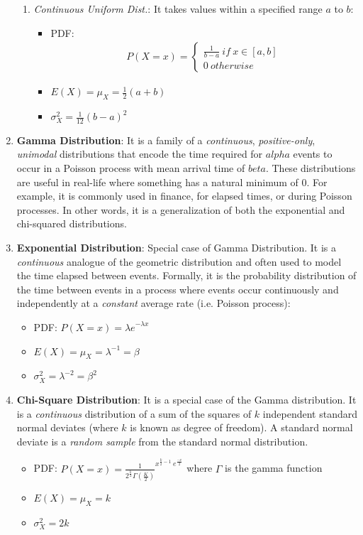 \documentclass[11pt, twocolumn]{article}
\begin{document}
\begin{enumerate}
\begin{enumerate}
	\item \textit{Continuous Uniform Dist.}: It takes values within a specified range $a$ to $b$:
		\begin{itemize}
		\item PDF:
		\begin{align*}
			P(X = x) = \begin{cases}  \frac{1}{b-a}~ if ~ x \in [a , b]\\ 0 ~ otherwise \end{cases}
		\end{align*}
		\item $E(X) = \mu_X = \frac{1}{2} (a+b)$
		\item $\sigma_X^2 =\frac{1}{12} (b - a)^2 $
		\end{itemize} 

	\end{enumerate}

\item \textbf{Gamma Distribution}: It is a family of a \textit{continuous}, \textit{positive-only}, \textit{unimodal} distributions that encode the time required for $alpha$ events to occur in a Poisson process with mean arrival time of $beta$. These distributions are useful in real-life where something has a natural minimum of $0$. For example, it is commonly used in finance, for elapsed times, or during Poisson processes. In other words, it is a generalization of both the exponential and chi-squared distributions.
		
\item \textbf{Exponential Distribution}: Special case of Gamma Distribution. It is a \textit{continuous} analogue of the geometric distribution and often used to model the time elapsed between events. Formally, it is the probability distribution of the time between events in a process where events occur continuously and independently at a \textit{constant} average rate (i.e. Poisson process):
		\begin{itemize}
		\item PDF: $P(X = x) = {\lambda e}^{-\lambda x}$
		\item $E(X) = \mu_X = \lambda^{-1} = \beta$
		\item $\sigma_X^2 =\lambda^{-2} = \beta^2$
		\end{itemize} 

\item \textbf{Chi-Square Distribution}:  It is a special case of the Gamma distribution. It is a \textit{continuous} distribution of a sum of the squares of $k$ independent standard normal deviates (where $k$ is known as degree of freedom).  A standard normal deviate is a \textit{random sample} from the standard normal distribution.
		\begin{itemize}
		\item PDF: $P(X = x) = {\frac{1}{2^{\frac{k}{2}}\Gamma(	\frac{K}{2})}}^{x^{\frac{k}{2}-1}~e^{\frac{-x}{2}}}$ where $\Gamma$ is the gamma function
		\item $E(X) = \mu_X = k$
		\item $\sigma_X^2 = 2k$
		\end{itemize} 
	

\end{enumerate}
\end{document}

